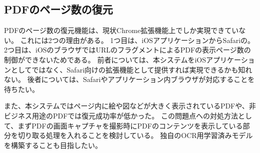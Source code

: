 \subsection{PDFのページ数の復元}
PDFのページ数の復元機能は、現状Chrome拡張機能上でしか実現できていない。
これには2つの理由がある。
1つ目は、iOSアプリケーションからSafariの。
2つ目は、iOSのブラウザではURLのフラグメントによるPDFの表示ページ数の制御ができないためである。
前者については、本システムをiOSアプリケーションとしてではなく、Safari向けの拡張機能として提供すれば実現できるかも知れない。
後者については、Safariやアプリケーション内ブラウザが対応することを待ちたい。

また、本システムではページ内に絵や図などが大きく表示されているPDFや、非ビジネス用途のPDFでは復元成功率が低かった。
この問題点への対処方法として、まずPDFの画面キャプチャを撮影時にPDFのコンテンツを表示している部分を切り取る処理を入れることを検討している。
独自のOCR用学習済みモデルを構築することも目指したい。